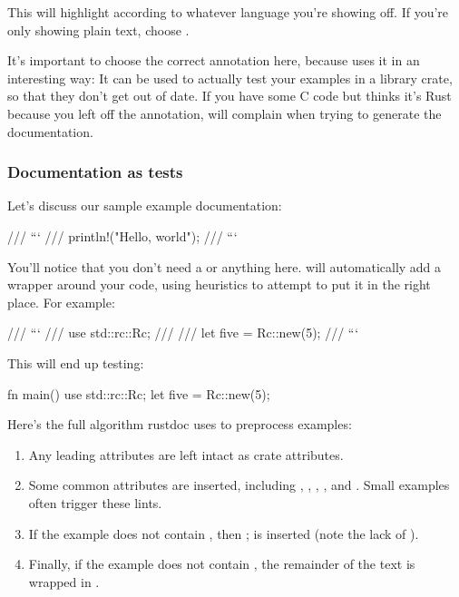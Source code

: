 This will highlight according to whatever language you're showing off. If you're only showing plain text, choose .

\blank

It's important to choose the correct annotation here, because  uses it in an interesting way: It can be used to 
actually test your examples in a library crate, so that they don't get out of date. If you have some C code but  
thinks it's Rust because you left off the annotation,  will complain when trying to generate the documentation.

\subsubsection*{Documentation as tests}

Let's discuss our sample example documentation:

\begin{rustc}
/// ```
/// println!("Hello, world");
/// ```
\end{rustc}

You'll notice that you don't need a  or anything here.  will automatically add a  
wrapper around your code, using heuristics to attempt to put it in the right place. For example:

\begin{rustc}
/// ```
/// use std::rc::Rc;
///
/// let five = Rc::new(5);
/// ```
\end{rustc}

This will end up testing:

\begin{rustc}
fn main() {
    use std::rc::Rc;
    let five = Rc::new(5);
}
\end{rustc}

Here's the full algorithm rustdoc uses to preprocess examples:

\begin{enumerate}
  \item{Any leading \code{\#![foo]} attributes are left intact as crate attributes.}
  \item{Some common  attributes are inserted, including , , , 
      , and . Small examples often trigger these lints.}
  \item{If the example does not contain , then ; is inserted (note the lack of 
      ).}
  \item{Finally, if the example does not contain , the remainder of the text is wrapped in .}
\end{enumerate}

